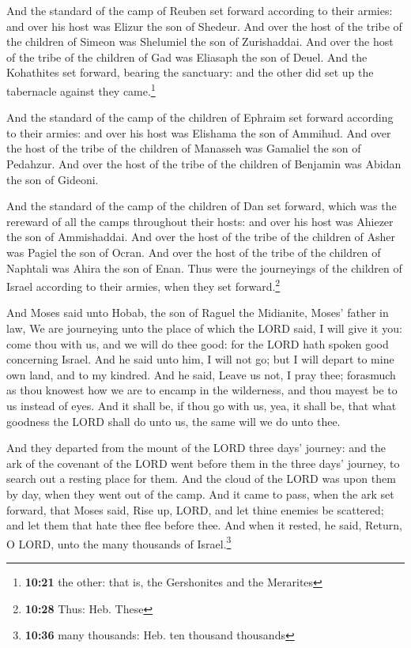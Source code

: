  And the standard of the camp of Reuben set forward
according to their armies: and over his host was Elizur the son of
Shedeur.  And over the host of the tribe of the children
of Simeon was Shelumiel the son of Zurishaddai.  And over
the host of the tribe of the children of Gad was Eliasaph the son of
Deuel.  And the Kohathites set forward, bearing the
sanctuary: and the other did set up the tabernacle against they
came.\footnote{\textbf{10:21} the other: that is, the Gershonites and
  the Merarites}

 And the standard of the camp of the children of Ephraim
set forward according to their armies: and over his host was Elishama
the son of Ammihud.  And over the host of the tribe of
the children of Manasseh was Gamaliel the son of Pedahzur.
 And over the host of the tribe of the children of
Benjamin was Abidan the son of Gideoni.

 And the standard of the camp of the children of Dan set
forward, which was the rereward of all the camps throughout their hosts:
and over his host was Ahiezer the son of Ammishaddai. 
And over the host of the tribe of the children of Asher was Pagiel the
son of Ocran.  And over the host of the tribe of the
children of Naphtali was Ahira the son of Enan.  Thus
were the journeyings of the children of Israel according to their
armies, when they set forward.\footnote{\textbf{10:28} Thus: Heb. These}

 And Moses said unto Hobab, the son of Raguel the
Midianite, Moses' father in law, We are journeying unto the place of
which the LORD said, I will give it you: come thou with us, and we will
do thee good: for the LORD hath spoken good concerning Israel.
 And he said unto him, I will not go; but I will depart
to mine own land, and to my kindred.  And he said, Leave
us not, I pray thee; forasmuch as thou knowest how we are to encamp in
the wilderness, and thou mayest be to us instead of eyes.
 And it shall be, if thou go with us, yea, it shall be,
that what goodness the LORD shall do unto us, the same will we do unto
thee.

 And they departed from the mount of the LORD three days'
journey: and the ark of the covenant of the LORD went before them in the
three days' journey, to search out a resting place for them.
 And the cloud of the LORD was upon them by day, when
they went out of the camp.  And it came to pass, when the
ark set forward, that Moses said, Rise up, LORD, and let thine enemies
be scattered; and let them that hate thee flee before thee.
 And when it rested, he said, Return, O LORD, unto the
many thousands of Israel.\footnote{\textbf{10:36} many thousands: Heb.
  ten thousand thousands}

